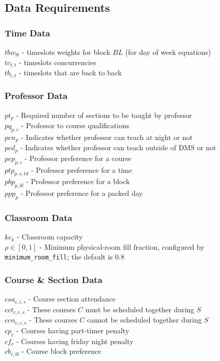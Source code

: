 \documentclass[11pt, oneside]{article}   	%
\begin{document}
\subsection{Data Requirements}


\subsubsection{Time Data}
$tbw_{bl}$ - timeslots weights for block $BL$ (for day of week equations)  \\
$tc_{t,t}$ - timeslots concurrencies \\
$tb_{t,t}$ - timeslots that are back to back


\subsubsection{Professor Data}
$pt_{p}$ - Required number of sections to be taught by professor \\
$pq_{p,c}$ - Professor to course qualifications \\
$pcn_{p}$ - Indicates whether professor can teach at night or not \\
$pcd_{p}$ - Indicates whether professor can teach outside of DMS or not \\
$pcp_{p,c}$ - Professor preference for a course \\
$ptp_{p,s,td}$ - Professor preference for a time \\
$pbp_{p,bl}$ - Professor preference for a block \\
$ppp_{p}$ - Professor preference for a packed day 


\subsubsection{Classroom Data}
$kc_{k}$ - Classroom capacity\\
$\rho\in[0,1]$ - Minimum physical-room fill fraction, configured by
\texttt{minimum\_room\_fill}; the default is $0.8$


\subsubsection{Course \& Section Data}
$csa_{c,i,s}$ - Course section attendance \\
$cct_{c,c,s}$ - These courses $C$ must be scheduled together during $S$ \\
$ccn_{c,c,s}$ - These courses $C$ cannot be scheduled together during $S$ \\
$cp_{c}$ - Courses having part-timer penalty \\
$cf_{c}$ - Courses having friday night penalty \\
$cb_{c,bl}$ - Course block preference
\end{document}

